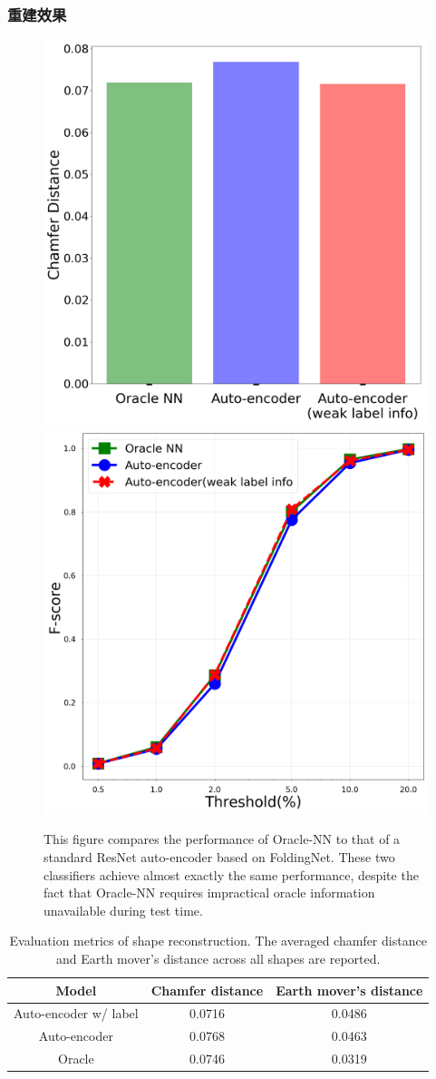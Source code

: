 \documentclass[bachelor, nocolorlinks, printoneside]{seuthesis} %
\begin{document}
\begin{Main}
\subsubsection{重建效果}
\begin{figure}[!htb]
    \centering
    \includegraphics[width=.40\textwidth]{figs/chamfer-compare.png}
    \includegraphics[width=.40\textwidth]{figs/F-compare.png}
    \caption{\small This figure compares the performance of Oracle-NN to that of a standard ResNet auto-encoder based on FoldingNet. These two classifiers achieve almost exactly the same performance, despite the fact that Oracle-NN requires impractical oracle information unavailable during test time.}
    \label{fig:compare-Oracle-NN}
\end{figure}

\begin{table}
    \centering
    \begin{tabular}{|c@{}|c@{}|c@{}|} \hline
    Model &  Chamfer distance   &  Earth mover's distance\\ \hline
    Auto-encoder w/ label &  0.0716  & 0.0486 \\
    Auto-encoder & 0.0768 & 0.0463 \\
    Oracle & 0.0746 & 0.0319 \\ \hline
    \end{tabular}
    \vspace{2mm}
    \caption{Evaluation metrics of shape reconstruction. The averaged chamfer distance and Earth mover's distance across all shapes are reported.}
    \label{tab:evaluation}
\end{table}


\end{Main}
\end{document}
